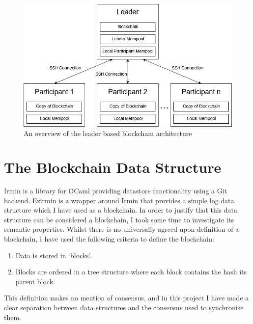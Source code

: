 \documentclass[12pt,a4paper,twoside,openright]{report}
\begin{document}
	\begin{figure}
		\centering
		\includegraphics[width=16cm]{figs/System_Architecture.png}
		\caption{An overview of the leader based blockchain architecture}
		\label{fig:sysarch}
	\end{figure}

	\section{The Blockchain Data Structure}\label{sec:datastructure}
	Irmin is a library for OCaml providing datastore functionality using a Git backend.
	Ezirmin is a wrapper around Irmin that provides a simple log data structure which I have used as a blockchain.
	In order to justify that this data structure can be considered a blockchain, I took some time to investigate its semantic properties. 
	Whilst there is no universally agreed-upon definition of a blockchain, I have used the following criteria to define the blockchain:
	\begin{enumerate}
		\item Data is stored in `blocks'.
		\item Blocks are ordered in a tree structure where each block contains the hash its parent block.
	\end{enumerate}
	This definition makes no mention of consensus, and in this project I have made a clear separation between data structures and the consensus used to synchronise them.
\end{document}
